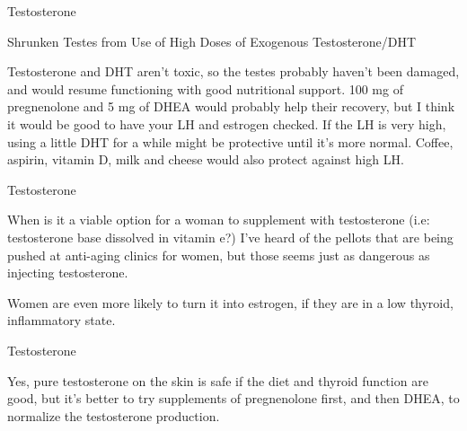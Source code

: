 \documentclass[11pt,oneside,openany,extrafontsizes]{memoir}
\begin{document}
\begin{standalonequote}{Testosterone}
    \begin{note}
        Shrunken Testes from Use of High Doses of Exogenous Testosterone/DHT
    \end{note}

    \begin{answer}
        Testosterone and DHT aren't toxic, so the testes probably haven't been damaged, and would resume functioning with good nutritional support. 100 mg of pregnenolone and 5 mg of DHEA would probably help their recovery, but I think it would be good to have your LH and estrogen checked. If the LH is very high, using a little DHT for a while might be protective until it's more normal. Coffee, aspirin, vitamin D, milk and cheese would also protect against high LH.
    \end{answer}
\end{standalonequote}

\begin{qaexchange}{Testosterone}

    \begin{question}
        When is it a viable option for a woman to supplement with testosterone (i.e: testosterone base dissolved in vitamin e?) I've heard of the pellots that are being pushed at anti-aging clinics for women, but those seems just as dangerous as injecting testosterone.
    \end{question}

    \begin{answer}
        Women are even more likely to turn it into estrogen, if they are in a low thyroid, inflammatory state.
    \end{answer}
\end{qaexchange}

\begin{standalonequote}{Testosterone}

    \begin{answer}
        Yes, pure testosterone on the skin is safe if the diet and thyroid function are good, but it's better to try supplements of pregnenolone first, and then DHEA, to normalize the testosterone production.
    \end{answer}
\end{standalonequote}
\end{document}
